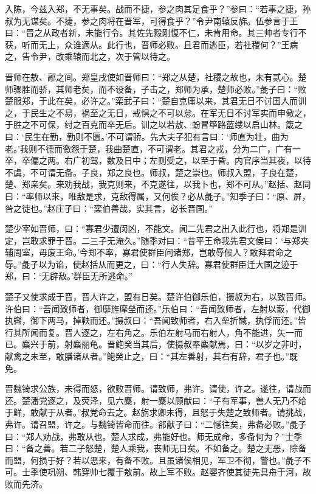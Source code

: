 \documentclass[a4paper,12pt,UTF8,twoside]{ctexbook}
\begin{document}
入陈，今兹入郑，不无事矣。战而不捷，参之肉其足食乎？”参曰：“若事之捷，孙叔为无谋矣。不捷，参之肉将在晋军，可得食乎？”令尹南辕反旆。伍参言于王曰：“晋之从政者新，未能行令。其佐先縠刚愎不仁，未肯用命。其三帅者专行不获，听而无上，众谁適从。此行也，晋师必败。且君而逃臣，若社稷何？”王病之，告令尹，改乘辕而北之，次于管以待之。

晋师在敖、鄗之间。郑皇戌使如晋师曰：“郑之从楚，社稷之故也，未有贰心。楚师骤胜而骄，其师老矣，而不设备，子击之，郑师为承，楚师必败。”彘子曰：“败楚服郑，于此在矣，必许之。”栾武子曰：“楚自克庸以来，其君无日不讨国人而训之，于民生之不易，祸至之无日，戒惧之不可以怠。在军无日不讨军实而申儆之，于胜之不可保，纣之百克而卒无后。训之以若敖、蚡冒筚路蓝缕以启山林。箴之曰：‘民生在勤，勤则不匮。’不可谓骄。先大夫子犯有言曰：‘师直为壮，曲为老。’我则不德而徼怨于楚，我曲楚直，不可谓老。其君之戎，分为二广，广有一卒，卒偏之两。右广初驾，数及日中；左则受之，以至于昏。内官序当其夜，以待不虞，不可谓无备。子良，郑之良也。师叔，楚之崇也。师叔入盟，子良在楚，楚、郑亲矣。来劝我战，我克则来，不克遂往，以我卜也，郑不可从。”赵括、赵同曰：“率师以来，唯敌是求，克敌得属，又何俟？必从彘子。”知季子曰：“原、屏，咎之徒也。”赵庄子曰：“栾伯善哉，实其言，必长晋国。”

楚少宰如晋师，曰：“寡君少遭闵凶，不能文。闻二先君之出入此行也，将郑是训定，岂敢求罪于晋。二三子无淹久。”随季对曰：“昔平王命我先君文侯曰：‘与郑夹辅周室，毋废王命。’今郑不率，寡君使群臣问诸郑，岂敢辱候人？敢拜君命之辱。”彘子以为谄，使赵括从而更之，曰：“行人失辞。寡君使群臣迁大国之迹于郑，曰：‘无辟敌。’群臣无所逃命。”

楚子又使求成于晋，晋人许之，盟有日矣。楚许伯御乐伯，摄叔为右，以致晋师。许伯曰：“吾闻致师者，御靡旌摩垒而还。”乐伯曰：“吾闻致师者，左射以菆，代御执辔，御下两马，掉鞅而还。”摄叔曰：“吾闻致师者，右入垒折馘，执俘而还。”皆行其所闻而复。晋人逐之，左右角之。乐伯左射马而右射人，角不能进，矢一而已。麋兴于前，射麋丽龟。晋鲍癸当其后，使摄叔奉麋献焉，曰：“以岁之非时，献禽之未至，敢膳诸从者。”鲍癸止之，曰：“其左善射，其右有辞，君子也。”既免。

晋魏锜求公族，未得而怒，欲败晋师。请致师，弗许。请使，许之。遂往，请战而还。楚潘党逐之，及荧泽，见六麋，射一麋以顾献曰：“子有军事，兽人无乃不给于鲜，敢献于从者。”叔党命去之。赵旃求卿未得，且怒于失楚之致师者。请挑战，弗许。请召盟，许之。与魏锜皆命而往。郤献子曰：“二憾往矣，弗备必败。”彘子曰：“郑人劝战，弗敢从也。楚人求成，弗能好也。师无成命，多备何为？”士季曰：“备之善。若二子怒楚，楚人乘我，丧师无日矣。不如备之。楚之无恶，除备而盟，何损于好？若以恶来，有备不败。且虽诸侯相见，军卫不彻，警也。”彘子不可。士季使巩朔、韩穿帅七覆于敖前。故上军不败。赵婴齐使其徒先具舟于河，故败而先济。
\end{document}
